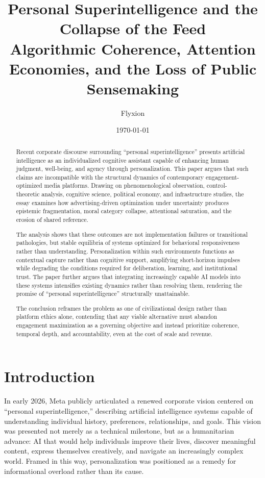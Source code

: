 \documentclass[12pt]{article}
\title{\textbf{Personal Superintelligence and the Collapse of the Feed}\\
\large Algorithmic Coherence, Attention Economies, and the Loss of Public Sensemaking}
\author{Flyxion}
\date{\today}
\begin{document}
\maketitle

\begin{abstract}
Recent corporate discourse surrounding ``personal superintelligence'' presents artificial intelligence as an individualized cognitive assistant capable of enhancing human judgment, well-being, and agency through personalization. This paper argues that such claims are incompatible with the structural dynamics of contemporary engagement-optimized media platforms. Drawing on phenomenological observation, control-theoretic analysis, cognitive science, political economy, and infrastructure studies, the essay examines how advertising-driven optimization under uncertainty produces epistemic fragmentation, moral category collapse, attentional saturation, and the erosion of shared reference.

The analysis shows that these outcomes are not implementation failures or transitional pathologies, but stable equilibria of systems optimized for behavioral responsiveness rather than understanding. Personalization within such environments functions as contextual capture rather than cognitive support, amplifying short-horizon impulses while degrading the conditions required for deliberation, learning, and institutional trust. The paper further argues that integrating increasingly capable AI models into these systems intensifies existing dynamics rather than resolving them, rendering the promise of ``personal superintelligence'' structurally unattainable.

The conclusion reframes the problem as one of civilizational design rather than platform ethics alone, contending that any viable alternative must abandon engagement maximization as a governing objective and instead prioritize coherence, temporal depth, and accountability, even at the cost of scale and revenue.
\end{abstract}

\newpage
\section{Introduction}

In early 2026, Meta publicly articulated a renewed corporate vision centered on ``personal superintelligence,'' describing artificial intelligence systems capable of understanding individual history, preferences, relationships, and goals. This vision was presented not merely as a technical milestone, but as a humanitarian advance: AI that would help individuals improve their lives, discover meaningful content, express themselves creatively, and navigate an increasingly complex world. Framed in this way, personalization was positioned as a remedy for informational overload rather than its cause.
\end{document}
